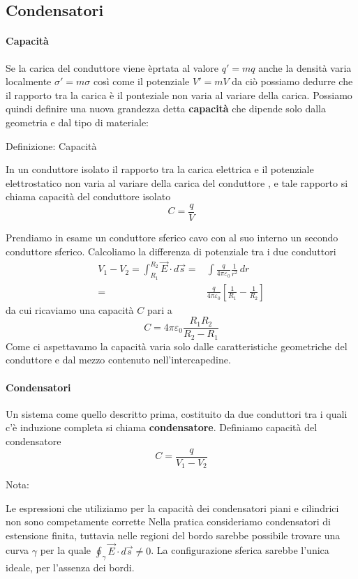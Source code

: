 \documentclass[x11names]{report}
\newcommand{\definizione}[2]{
	\begin{center}
		\fboxsep11pt
		\colorbox{myblue}{\begin{minipage}{5.75in}
				\begin{blues}{Definizione: #1}
					#2
				\end{blues}
		\end{minipage}}
	\end{center}
}
\newcommand{\nota}[2]{
	\begin{attenzione}{Nota:}
		#2
	\end{attenzione}
}
\begin{document}
\subsection{Condensatori}
\paragraph{Capacità}
Se la carica del conduttore viene èprtata al valore \(q' = mq\) anche la densità varia localmente \(\sigma'=m\sigma\) così come il potenziale \(V'=mV\) da ciò possiamo dedurre che il rapporto tra la carica è il ponteziale non varia al variare della carica. Possiamo quindi definire una nuova grandezza detta \textbf{capacità} che dipende solo dalla geometria e dal tipo di materiale:
\definizione{Capacità}{
In un conduttore isolato il rapporto tra la carica elettrica e il potenziale elettrostatico non varia al variare della carica del conduttore , e tale rapporto si chiama capacità del conduttore isolato
\begin{equation}
	C = \frac{q}{V}
\end{equation}
}
Prendiamo in esame un conduttore sferico cavo con al suo interno un secondo conduttore sferico. Calcoliamo la differenza di potenziale tra i due conduttori
\begin{align*}
	V_1 - V_2 = \int_{R_1}^{R_2} \vec{E}\cdot d\vec{s} =& \int \frac{q}{4\pi \varepsilon_0} \frac{1}{r^2} \, dr \\
	=& \frac{q}{4\pi \varepsilon_0}\left[\frac{1}{R_1} - \frac{1}{R_2}\right]
\end{align*}
da cui ricaviamo una capacità \(C\) pari a 
\[
C = 4\pi\varepsilon_0\frac{R_1R_2}{R_2 - R_1}
\]
Come ci aspettavamo la capacità varia solo dalle caratteristiche geometriche del conduttore e dal mezzo contenuto nell'intercapedine. 

\paragraph{Condensatori}
Un sistema come quello descritto prima, costituito da due conduttori tra i quali c'è induzione completa si chiama \textbf{condensatore}. Definiamo capacità del condensatore 
\begin{equation}
	C = \frac{q}{V_1 - V_2}
\end{equation}

\nota{}{
Le espressioni che utiliziamo per la capacità dei condensatori piani e cilindrici non sono competamente corrette Nella pratica consideriamo condensatori di estensione finita, tuttavia nelle regioni del bordo sarebbe possibile trovare una curva \(\gamma\) per la quale \(\oint_\gamma \vec{E}\cdot d\vec{s} \neq 0\). La configurazione sferica sarebbe l'unica ideale, per l'assenza dei bordi.
}
\end{document}
